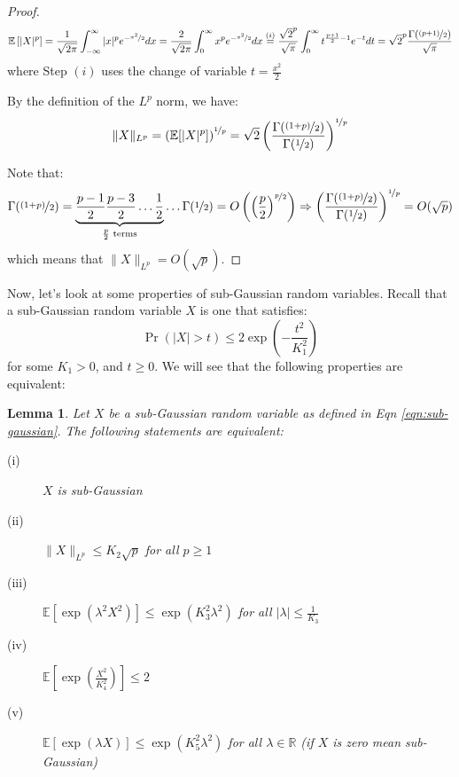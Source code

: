 \documentclass{article}
\newtheorem{lemma}{Lemma}[subsection]
\theoremstyle{remark}
\newcommand{\real}{\mathbb{R}}
\newcommand{\Exp}{\mathbb{E}}
\begin{document}
\begin{proof}
\begin{equation*}
\Exp\left[|X|^{p}\right] = \frac{1}{\sqrt{2\pi}}\int_{-\infty}^{\infty} |x|^{p}e^{-\nicefrac{x^{2}}{2}} dx = \frac{2}{\sqrt{2\pi}}\int_{0}^{\infty} x^{p}e^{-\nicefrac{x^{2}}{2}} dx \overset{(i)}= \frac{\sqrt{2}^{p}}{\sqrt{\pi}}\int_{0}^{\infty} t^{\frac{p+1}{2} - 1} e^{-t} dt = \sqrt{2}^{p}\frac{\Gamma(\nicefrac{(p + 1)}{2})}{\sqrt{\pi}}
\end{equation*}
where Step \((i)\) uses the change of variable \(t = \frac{x^{2}}{2}\)

By the definition of the \(L^{p}\) norm, we have:
\begin{equation*}
\|X\|_{L^{p}} = \left(\Exp[|X|^{p}]\right)^{\nicefrac{1}{p}} = \sqrt{2}\left(\frac{\Gamma(\nicefrac{(1 + p)}{2})}{\Gamma(\nicefrac{1}{2})}\right)^{\nicefrac{1}{p}}
\end{equation*}

Note that:
\begin{equation*}
\Gamma(\nicefrac{(1 + p)}{2}) = \underbrace{\frac{p - 1}{2}\frac{p - 3}{2}\ldots\frac{1}{2}}_{\frac{p}{2} \text{ terms}}\ldots\Gamma(\nicefrac{1}{2}) = O\left(\left(\frac{p}{2}\right)^{\nicefrac{p}{2}}\right) \Rightarrow \left(\frac{\Gamma(\nicefrac{(1 + p)}{2})}{\Gamma(\nicefrac{1}{2})}\right)^{\nicefrac{1}{p}} = O(\sqrt{p})
\end{equation*}
which means that \(\|X\|_{L^{p}} = O(\sqrt{p})\).
\end{proof}

Now, let's look at some properties of sub-Gaussian random variables. Recall that a sub-Gaussian random variable \(X\) is one that satisfies:
\begin{equation}
\label{eqn:sub-gaussian}
\Pr(|X| > t) \leq 2\exp\left(-\frac{t^{2}}{K_{1}^{2}}\right)
\end{equation}
for some \(K_{1} > 0\), and \(t \geq 0\). We will see that the following properties are equivalent:

\begin{lemma}
\label{lem:sub-gauss-equiv}
Let \(X\) be a sub-Gaussian random variable as defined in Eqn \ref{eqn:sub-gaussian}. The following statements are equivalent:
\begin{description}
\item [(i)] \(X\) is sub-Gaussian
\item [(ii)] \(\|X\|_{L^{p}} \leq K_{2}\sqrt{p}\) for all \(p \geq 1\)
\item [(iii)] \(\Exp[\exp(\lambda^{2}X^{2})] \leq \exp(K_{3}^{2}\lambda^{2})\) for all \(|\lambda| \leq \frac{1}{K_{3}}\)
\item [(iv)] \(\Exp\left[\exp\left(\frac{X^{2}}{K_{4}^{2}}\right)\right] \leq 2\)
\item [(v)] \(\Exp\left[\exp(\lambda X)\right] \leq \exp(K_{5}^{2}\lambda^{2})\) for all \(\lambda \in \real\) (if \(X\) is zero mean sub-Gaussian)
\end{description}
\end{lemma}
\end{document}
